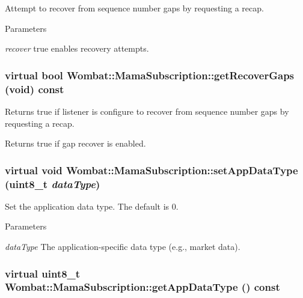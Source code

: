 Attempt to recover from sequence number gaps by requesting a recap. 
\begin{DoxyParams}{Parameters}
\item[{\em recover}]true enables recovery attempts. \end{DoxyParams}
\hypertarget{classWombat_1_1MamaSubscription_a9db98b670db5607279d089747554413c}{
\subsubsection[{getRecoverGaps}]{\setlength{\rightskip}{0pt plus 5cm}virtual bool Wombat::MamaSubscription::getRecoverGaps (void) const}}
\label{classWombat_1_1MamaSubscription_a9db98b670db5607279d089747554413c}


Returns true if listener is configure to recover from sequence number gaps by requesting a recap. \begin{DoxyReturn}{Returns}
true if gap recover is enabled. 
\end{DoxyReturn}
\hypertarget{classWombat_1_1MamaSubscription_a1409842bd326bae11d6b98a75f5cd911}{
\subsubsection[{setAppDataType}]{\setlength{\rightskip}{0pt plus 5cm}virtual void Wombat::MamaSubscription::setAppDataType (uint8\_\-t {\em dataType})}}
\label{classWombat_1_1MamaSubscription_a1409842bd326bae11d6b98a75f5cd911}


Set the application data type. The default is 0.


\begin{DoxyParams}{Parameters}
\item[{\em dataType}]The application-\/specific data type (e.g., market data). \end{DoxyParams}
\hypertarget{classWombat_1_1MamaSubscription_a67bf253f898a3dd824f9020f7bc97a5a}{
\subsubsection[{getAppDataType}]{\setlength{\rightskip}{0pt plus 5cm}virtual uint8\_\-t Wombat::MamaSubscription::getAppDataType () const}}
\label{classWombat_1_1MamaSubscription_a67bf253f898a3dd824f9020f7bc97a5a}


